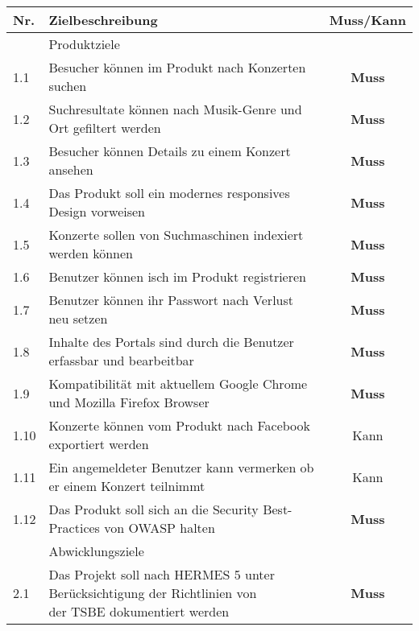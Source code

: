\begin{longtable}[]{@{}llc@{}}
  \toprule
  Nr.  & Zielbeschreibung                                                                                                                 & Muss/Kann\tabularnewline
  \toprule
       & Produktziele\tabularnewline
  \midrule
  1.1  & Besucher können im Produkt nach Konzerten suchen                                                                                 & \textbf{Muss}\tabularnewline
  1.2  & Suchresultate können nach Musik-Genre und Ort gefiltert werden                                                                   & \textbf{Muss}\tabularnewline
  1.3  & Besucher können Details zu einem Konzert ansehen                                                                                 & \textbf{Muss}\tabularnewline
  1.4  & Das Produkt soll ein modernes responsives Design vorweisen                                                                       & \textbf{Muss}\tabularnewline
  1.5  & Konzerte sollen von Suchmaschinen indexiert werden können                                                                        & \textbf{Muss}\tabularnewline
  1.6  & Benutzer können isch im Produkt registrieren                                                                                     & \textbf{Muss}\tabularnewline
  1.7  & Benutzer können ihr Passwort nach Verlust neu setzen                                                                             & \textbf{Muss}\tabularnewline
  1.8  & Inhalte des Portals sind durch die Benutzer erfassbar und bearbeitbar                                                            & \textbf{Muss}\tabularnewline
  1.9  & Kompatibilität mit aktuellem Google Chrome und Mozilla Firefox Browser                                                           & \textbf{Muss}\tabularnewline
  1.10 & Konzerte können vom Produkt nach Facebook exportiert werden                                                                      & Kann\tabularnewline
  1.11 & Ein angemeldeter Benutzer kann vermerken ob er einem Konzert teilnimmt                                                           & Kann\tabularnewline
  1.12 & Das Produkt soll sich an die Security Best-Practices von OWASP halten                                                            & \textbf{Muss}\tabularnewline
  \bottomrule
       & Abwicklungsziele\tabularnewline
  \midrule
  2.1  & \makecell[l]{Das Projekt soll nach HERMES 5 unter Berücksichtigung der Richtlinien von                                                                          \\ der TSBE dokumentiert werden} & \textbf{Muss}\tabularnewline

\end{longtable}
